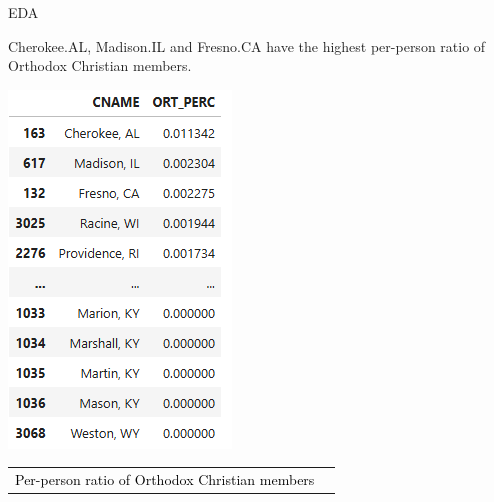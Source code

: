 \documentclass[12pt]{beamer}
\begin{document}
\begin{frame}{EDA}



Cherokee.AL, Madison.IL and Fresno.CA have the highest per-person ratio of Orthodox Christian members.
\begin{center}
    \includegraphics[width=0.8\linewidth, height=0.6\textheight, keepaspectratio]{Cname_ort.png}
    
    \vspace{1em}
    \begin{tabular}{ll}
      \textcolor{black}{ Per-person ratio of Orthodox 
 Christian members
 }\\

    \end{tabular}
\end{center}




\end{frame}
\end{document}
